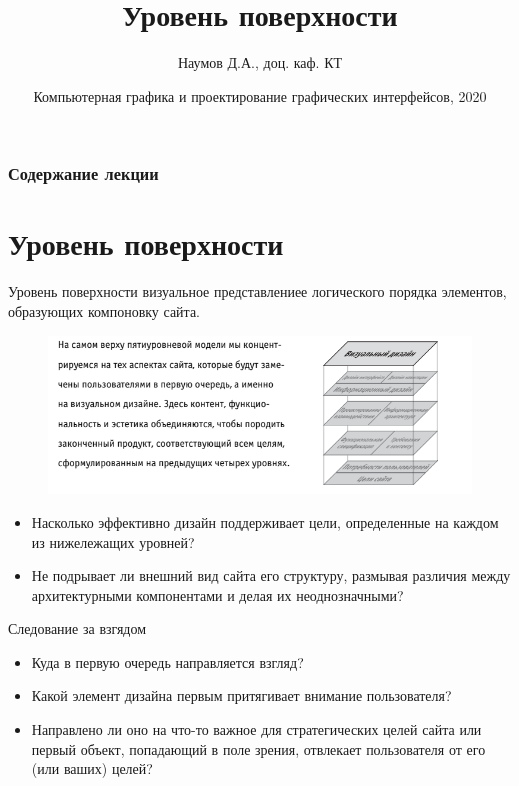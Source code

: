 \documentclass{beamer}
\title[Уровень поверхности]{Уровень поверхности}
\author{Наумов Д.А., доц. каф. КТ}
\date[21.10.2020] {Компьютерная графика и проектирование графических интерфейсов, 2020}
\begin{document}
\begin{frame}
  \titlepage
\end{frame}
  
\begin{frame}
  \frametitle{Содержание лекции}
  \tableofcontents  
\end{frame}

\section{Уровень поверхности}
  
\begin{frame}[t]
	\begin{block}{Уровень поверхности}
		визуальное представлениее логического порядка элементов, образующих компоновку сайта. 
	\end{block}
	\begin{figure}[h]
		\centering
		\includegraphics[scale=0.5]{images/lec05-pic01.png}
	\end{figure}
	\begin{itemize}
		\item Насколько эффективно дизайн поддерживает цели, определенные на каждом из нижележащих уровней? 
		\item Не подрывает ли внешний вид сайта его структуру, размывая различия между архитектурными компонентами и делая их неоднозначными?
	\end{itemize}
\end{frame} 

\begin{frame}[t]{Следование за взгядом}
	\begin{itemize}
		\item Куда в первую очередь направляется взгляд? 
		\item Какой элемент дизайна первым притягивает внимание пользователя? 
		\item Направлено ли оно на что-то важное для стратегических целей сайта или первый объект, попадающий в поле зрения, отвлекает пользователя от его (или ваших) целей?
	\end{itemize}
\end{frame}
\end{document}
